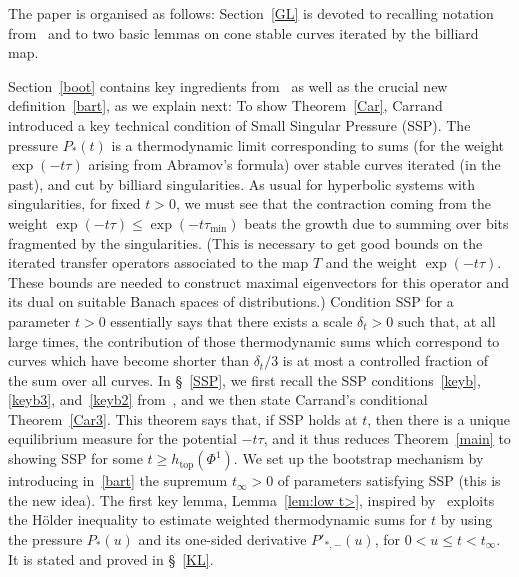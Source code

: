 \documentclass[AHL,Unicode,longabstracts,published]{cedram}
\newcommand{\htop}{h_{\scriptstyle{\text{top}}}}
\newcommand{\htop}{h_{\scriptstyle{\text{top}}}}
\begin{document}
The paper is organised as follows: Section~\ref{GL} is devoted to recalling notation from~\cite{BD1} and to two basic lemmas on cone stable curves iterated by the billiard map.

Section~\ref{boot} contains key ingredients from~\cite{Ca} as well as the crucial new definition~\eqref{bart}, as we explain next: To show Theorem~\ref{Car}, Carrand introduced a key technical condition of Small Singular Pressure (SSP). The pressure $P_*(t)$ is a thermodynamic limit corresponding to sums (for the weight $\exp(-t\tau)$ arising from Abramov's formula) over stable curves iterated (in the past), and cut by billiard singularities. As usual for hyperbolic systems with singularities, for fixed $t>0$, we must see that the contraction coming from the weight $\exp(-t\tau)\le \exp (-t\tau_{\min})$ beats the growth due to summing over bits fragmented by the singularities. (This is necessary to get good bounds on the iterated transfer operators associated to the map $T$ and the weight $\exp(-t\tau)$. These bounds are needed to construct maximal eigenvectors for this operator and its dual on suitable Banach spaces of distributions.) Condition SSP for a parameter $t>0$ essentially says that there exists a scale $\delta_t>0$ such that, at all large times, the contribution of those thermodynamic sums which correspond to curves which have become shorter than $\delta_t/3$ is at most a controlled fraction of the sum over all curves. In \S~\ref{SSP}, we first recall the SSP conditions~\eqref{keyb}, \eqref{keyb3}, and~\eqref{keyb2} from~\cite{Ca}, and we then state Carrand's conditional Theorem~\ref{Car3}. This theorem says that, if SSP holds at $t$, then there is a unique equilibrium measure for the potential $-t\tau$, and it thus reduces Theorem~\ref{main} to showing SSP for some $t\ge \htop(\Phi^1)$. We set up the bootstrap mechanism by introducing in~\eqref{bart} the supremum $t_\infty>0$ of parameters satisfying SSP (this is the new idea). The first key lemma, Lemma~\ref{lem:low t>}, inspired by~\cite[Lemma~3.10]{BD2} exploits the H\"older inequality to estimate weighted thermodynamic sums for $t$ by using the pressure $P_*(u)$ and its one-sided derivative $P'_{*,-}(u)$, for $0<u\le t<t_\infty$. It is stated and proved in \S~\ref{KL}.
\end{document}
